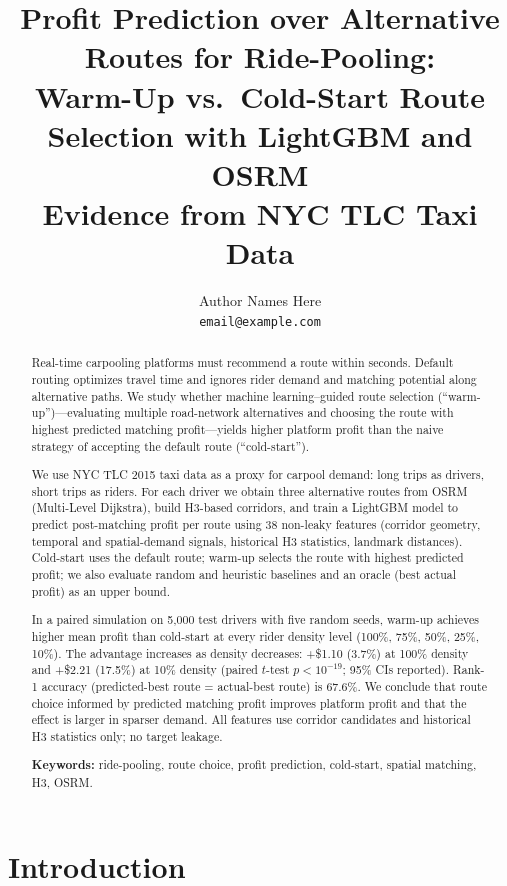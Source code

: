\documentclass[11pt,a4paper]{article}
\title{\textbf{Profit Prediction over Alternative Routes for Ride-Pooling:}\\[0.4em]
  \large Warm-Up vs.\ Cold-Start Route Selection with LightGBM and OSRM\\[0.3em]
  \normalsize Evidence from NYC TLC Taxi Data}
\author{Author Names Here\\
\texttt{email@example.com}}
\date{}
\begin{document}
\maketitle

\begin{abstract}
Real-time carpooling platforms must recommend a route within seconds. Default routing optimizes travel time and ignores rider demand and matching potential along alternative paths. We study whether machine learning--guided route selection (``warm-up'')---evaluating multiple road-network alternatives and choosing the route with highest predicted matching profit---yields higher platform profit than the naive strategy of accepting the default route (``cold-start'').

We use NYC TLC 2015 taxi data as a proxy for carpool demand: long trips as drivers, short trips as riders. For each driver we obtain three alternative routes from OSRM (Multi-Level Dijkstra), build H3-based corridors, and train a LightGBM model to predict post-matching profit per route using 38 non-leaky features (corridor geometry, temporal and spatial-demand signals, historical H3 statistics, landmark distances). Cold-start uses the default route; warm-up selects the route with highest predicted profit; we also evaluate random and heuristic baselines and an oracle (best actual profit) as an upper bound.

In a paired simulation on 5,000 test drivers with five random seeds, warm-up achieves higher mean profit than cold-start at every rider density level (100\%, 75\%, 50\%, 25\%, 10\%). The advantage increases as density decreases: +\$1.10 (3.7\%) at 100\% density and +\$2.21 (17.5\%) at 10\% density (paired $t$-test $p < 10^{-19}$; 95\% CIs reported). Rank-1 accuracy (predicted-best route = actual-best route) is 67.6\%. We conclude that route choice informed by predicted matching profit improves platform profit and that the effect is larger in sparser demand. All features use corridor candidates and historical H3 statistics only; no target leakage.

\noindent\textbf{Keywords:} ride-pooling, route choice, profit prediction, cold-start, spatial matching, H3, OSRM.
\end{abstract}

\section{Introduction}
\end{document}
